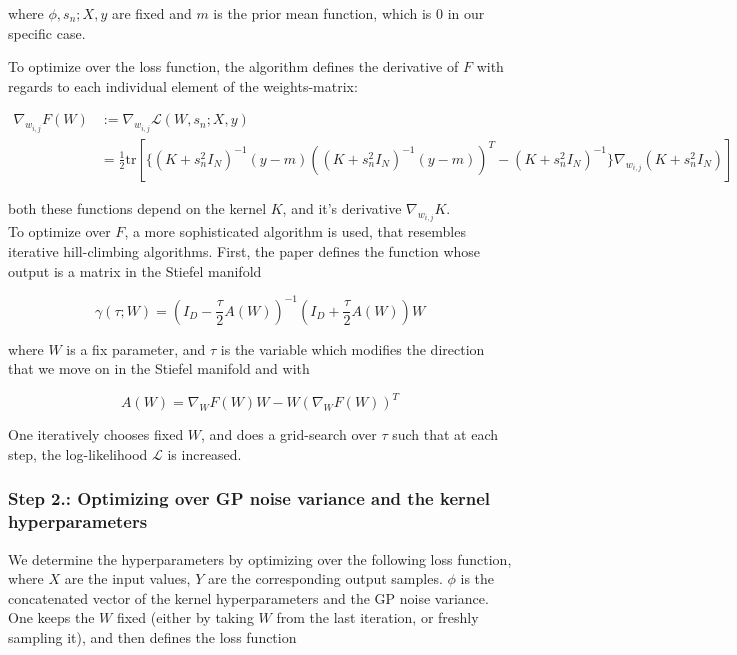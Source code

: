 where $\phi, s_n; X, y$ are fixed and $m$ is the prior mean function, which is 0 in our specific case.

To optimize over the loss function, the algorithm defines the derivative of $F$ with regards to each individual element of the weights-matrix:

\begin{align}
\nabla_{w_{i,j}} F(W) &:= \nabla_{w_{i,j}} \mathcal{L}(W, s_n; X, y) \\
& = \frac{1}{2} \text{tr} \left[ \{ (K + s_n^2 I_N)^{-1} (y-m) \left( (K + s_n^2 I_N)^{-1} (y-m) \right)^T - (K + s_n^2 I_N)^{-1} \} \nabla_{w_{i,j}} (K + s_n^2 I_N) \right]
\end{align}

both these functions depend on the kernel $K$, and it's derivative $\nabla_{w_{i,j}} K$. \\

To optimize over $F$, a more sophisticated algorithm is used, that resembles iterative hill-climbing algorithms.
First, the paper defines the function whose output is a matrix in the Stiefel manifold

\begin{equation}
\gamma(\tau; W) = (I_D - \frac{\tau}{2} A(W) )^{-1} (I_D + \frac{\tau}{2} A(W) ) W
\end{equation}


where $W$ is a fix parameter, and $\tau$ is the variable which modifies the direction that we move on in the Stiefel manifold and with

\begin{equation}
A(W) = \nabla_{W} F(W) W - W ( \nabla_{W} F(W) )^T
\end{equation}

One iteratively chooses fixed $W$, and does a grid-search over $\tau$ such that at each step, the log-likelihood $\mathcal{L}$ is increased.

\subsubsection{Step 2.: Optimizing over GP noise variance and the kernel hyperparameters}

We determine the hyperparameters by optimizing over the following loss function, where $X$ are the input values, $Y$ are the corresponding output samples. $\phi$ is the concatenated vector of the kernel hyperparameters and the GP noise variance. \\

One keeps the $W$ fixed (either by taking $W$ from the last iteration, or freshly sampling it), and then defines the loss function

